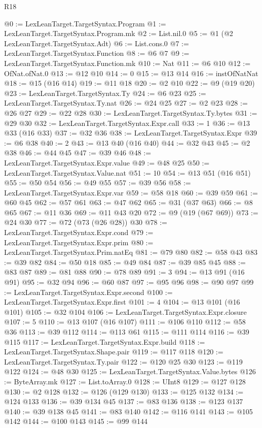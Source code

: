 \begin{lexlean}{R18}
\begin{coremodule}
@0 := LexLeanTarget.TargetSyntax.Program
@1 := LexLeanTarget.TargetSyntax.Program.mk
@2 := List.nil.{0}
@5 := @1 (@2 LexLeanTarget.TargetSyntax.Adt)
@6 := List.cons.{0}
@7 := LexLeanTarget.TargetSyntax.Function
@8 := @6 @7
@9 := LexLeanTarget.TargetSyntax.Function.mk
@10 := Nat
@11 := @6 @10
@12 := OfNat.ofNat.{0}
@13 := @12 @10
@14 := 0
@15 := @13 @14
@16 := instOfNatNat
@18 := @15 (@16 @14)
@19 := @11 @18
@20 := @2 @10
@22 := @9 (@19 @20)
@23 := LexLeanTarget.TargetSyntax.Ty
@24 := @6 @23
@25 := LexLeanTarget.TargetSyntax.Ty.nat
@26 := @24 @25
@27 := @2 @23
@28 := @26 @27
@29 := @22 @28
@30 := LexLeanTarget.TargetSyntax.Ty.bytes
@31 := @29 @30
@32 := LexLeanTarget.TargetSyntax.Expr.call
@33 := 1
@36 := @13 @33 (@16 @33)
@37 := @32 @36
@38 := LexLeanTarget.TargetSyntax.Expr
@39 := @6 @38
@40 := 2
@43 := @13 @40 (@16 @40)
@44 := @32 @43
@45 := @2 @38
@46 := @44 @45
@47 := @39 @46
@48 := LexLeanTarget.TargetSyntax.Expr.value
@49 := @48 @25
@50 := LexLeanTarget.TargetSyntax.Value.nat
@51 := 10
@54 := @13 @51 (@16 @51)
@55 := @50 @54
@56 := @49 @55
@57 := @39 @56
@58 := LexLeanTarget.TargetSyntax.Expr.var
@59 := @58 @18
@60 := @39 @59
@61 := @60 @45
@62 := @57 @61
@63 := @47 @62
@65 := @31 (@37 @63)
@66 := @8 @65
@67 := @11 @36
@69 := @11 @43 @20
@72 := @9 (@19 (@67 @69))
@73 := @24 @30
@77 := @72 (@73 (@26 @28)) @30
@78 := LexLeanTarget.TargetSyntax.Expr.cond
@79 := LexLeanTarget.TargetSyntax.Expr.prim
@80 := LexLeanTarget.TargetSyntax.Prim.natEq
@81 := @79 @80
@82 := @58 @43
@83 := @39 @82
@84 := @50 @18
@85 := @49 @84
@87 := @39 @85 @45
@88 := @83 @87
@89 := @81 @88
@90 := @78 @89
@91 := 3
@94 := @13 @91 (@16 @91)
@95 := @32 @94
@96 := @60 @87
@97 := @95 @96
@98 := @90 @97
@99 := LexLeanTarget.TargetSyntax.Expr.second
@100 := LexLeanTarget.TargetSyntax.Expr.first
@101 := 4
@104 := @13 @101 (@16 @101)
@105 := @32 @104
@106 := LexLeanTarget.TargetSyntax.Expr.closure
@107 := 5
@110 := @13 @107 (@16 @107)
@111 := @106 @110
@112 := @58 @36
@113 := @39 @112
@114 := @113 @61
@115 := @111 @114
@116 := @39 @115
@117 := LexLeanTarget.TargetSyntax.Expr.build
@118 := LexLeanTarget.TargetSyntax.Shape.pair
@119 := @117 @118
@120 := LexLeanTarget.TargetSyntax.Ty.pair
@122 := @120 @25 @30
@123 := @119 @122
@124 := @48 @30
@125 := LexLeanTarget.TargetSyntax.Value.bytes
@126 := ByteArray.mk
@127 := List.toArray.{0}
@128 := UInt8
@129 := @127 @128
@130 := @2 @128
@132 := @126 (@129 @130)
@133 := @125 @132
@134 := @124 @133
@136 := @39 @134 @45
@137 := @83 @136
@138 := @123 @137
@140 := @39 @138 @45
@141 := @83 @140
@142 := @116 @141
@143 := @105 @142
@144 := @100 @143
@145 := @99 @144

\end{coremodule}
\end{lexlean}

